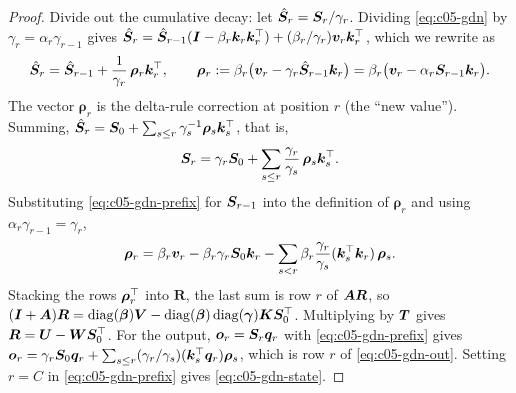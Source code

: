 \begin{proof}
Divide out the cumulative decay: let $\hat{\bm{S}}_r = \bm{S}_r/\gamma_r$. Dividing \cref{eq:c05-gdn} by
$\gamma_r = \alpha_r\gamma_{r-1}$ gives
$\hat{\bm{S}}_r = \hat{\bm{S}}_{r-1}(\bm{I} - \beta_r\bm{k}_r\bm{k}_r^{\top}) + (\beta_r/\gamma_r)\bm{v}_r\bm{k}_r^{\top}$, which we
rewrite as
\[
  \hat{\bm{S}}_r = \hat{\bm{S}}_{r-1} + \frac{1}{\gamma_r}\,\bm\rho_r\bm{k}_r^{\top},\qquad
  \bm\rho_r := \beta_r\big(\bm{v}_r - \gamma_r\hat{\bm{S}}_{r-1}\bm{k}_r\big)
             = \beta_r\big(\bm{v}_r - \alpha_r\bm{S}_{r-1}\bm{k}_r\big).
\]
The vector $\bm\rho_r$ is the delta-rule correction at position $r$ (the ``new value''). Summing,
$\hat{\bm{S}}_r = \bm{S}_0 + \sum_{s\le r}\gamma_s^{-1}\bm\rho_s\bm{k}_s^{\top}$, that is,
\begin{equation}\label{eq:c05-gdn-prefix}
  \bm{S}_r = \gamma_r\bm{S}_0 + \sum_{s\le r}\frac{\gamma_r}{\gamma_s}\,\bm\rho_s\bm{k}_s^{\top} .
\end{equation}
Substituting \cref{eq:c05-gdn-prefix} for $\bm{S}_{r-1}$ into the definition of $\bm\rho_r$ and using
$\alpha_r\gamma_{r-1} = \gamma_r$,
\[
  \bm\rho_r = \beta_r\bm{v}_r - \beta_r\gamma_r\bm{S}_0\bm{k}_r
              - \sum_{s<r}\beta_r\frac{\gamma_r}{\gamma_s}(\bm{k}_s^{\top}\bm{k}_r)\,\bm\rho_s .
\]
Stacking the rows $\bm\rho_r^{\top}$ into $\bm{R}$, the last sum is row $r$ of $\bm{A}\bm{R}$, so
$(\bm{I} + \bm{A})\bm{R} = \operatorname{diag}(\bm{\beta})\bm{V} - \operatorname{diag}(\bm{\beta})\operatorname{diag}(\bm\gamma)\bm{K}\bm{S}_0^{\top}$. Multiplying by
$\bm{T}$ gives $\bm{R} = \bm{U} - \bm{W}\bm{S}_0^{\top}$. For the output, $\bm{o}_r = \bm{S}_r\bm{q}_r$ with
\cref{eq:c05-gdn-prefix} gives
$\bm{o}_r = \gamma_r\bm{S}_0\bm{q}_r + \sum_{s\le r}(\gamma_r/\gamma_s)(\bm{k}_s^{\top}\bm{q}_r)\bm\rho_s$, which is row
$r$ of \cref{eq:c05-gdn-out}. Setting $r = C$ in \cref{eq:c05-gdn-prefix} gives
\cref{eq:c05-gdn-state}.
\end{proof}

